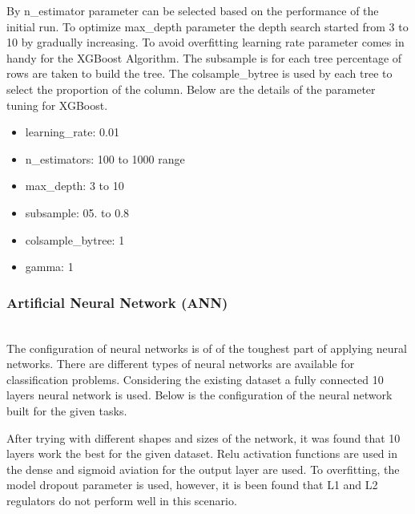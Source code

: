 By n\_estimator parameter can be selected based on the performance of the initial run. To optimize max\_depth parameter the depth search started from 3 to 10 by gradually increasing. To avoid overfitting learning rate parameter comes in handy for the XGBoost Algorithm. The subsample is for each tree percentage of rows are taken to build the tree. The colsample\_bytree is used by each tree to select the proportion of the column. Below are the details of the parameter tuning for XGBoost. 

\begin{itemize}
    \item learning\_rate: 0.01
    \item n\_estimators: 100 to 1000 range 
    \item max\_depth: 3 to 10 
    \item subsample: 05. to 0.8
    \item colsample\_bytree: 1
    \item gamma: 1 
\end{itemize}

\subsubsection{Artificial Neural Network (ANN)}\hspace*{\fill} \\
The configuration of neural networks is of of the toughest part of applying neural networks. There are different types of neural networks are available for classification problems. Considering the existing dataset a fully connected 10 layers neural network is used. Below is the configuration of the neural network built for the given tasks.  



After trying with different shapes and sizes of the network, it was found that 10 layers work the best for the given dataset. Relu activation functions are used in the dense and sigmoid aviation for the output layer are used. To overfitting, the model dropout parameter is used, however, it is been found that L1 and L2 regulators do not perform well in this scenario. 



